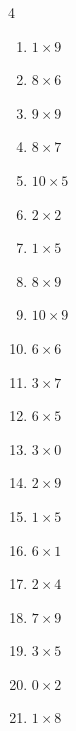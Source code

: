 \begin{multicols}{4}
\begin{enumerate}
  \item $1\times 9$
        \phantom{$=9$}

  \item $8\times 6$
        \phantom{$=48$}

  \item $9\times 9$
        \phantom{$=81$}

  \item $8\times 7$
        \phantom{$=56$}

  \item $10\times 5$
        \phantom{$=50$}

  \item $2\times 2$
        \phantom{$=4$}

  \item $1\times 5$
        \phantom{$=5$}

  \item $8\times 9$
        \phantom{$=72$}

  \item $10\times 9$
        \phantom{$=90$}

  \item $6\times 6$
        \phantom{$=36$}

  \item $3\times 7$
        \phantom{$=21$}

  \item $6\times 5$
        \phantom{$=30$}

  \item $3\times 0$
        \phantom{$=0$}

  \item $2\times 9$
        \phantom{$=18$}

  \item $1\times 5$
        \phantom{$=5$}

  \item $6\times 1$
        \phantom{$=6$}

  \item $2\times 4$
        \phantom{$=8$}

  \item $7\times 9$
        \phantom{$=63$}

  \item $3\times 5$
        \phantom{$=15$}

  \item $0\times 2$
        \phantom{$=0$}

  \item $1\times 8$
        \phantom{$=8$}


\end{enumerate}
\end{multicols}

